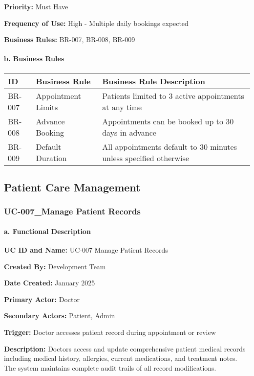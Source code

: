 \documentclass[12pt,a4paper]{article}
\begin{document}
\textbf{Priority:} Must Have

\textbf{Frequency of Use:} High - Multiple daily bookings expected

\textbf{Business Rules:} BR-007, BR-008, BR-009

\paragraph{b. Business Rules}

\begin{longtable}{|p{2cm}|p{4cm}|p{8cm}|}
\hline
\textbf{ID} & \textbf{Business Rule} & \textbf{Business Rule Description} \\
\hline
BR-007 & Appointment Limits & Patients limited to 3 active appointments at any time \\
\hline
BR-008 & Advance Booking & Appointments can be booked up to 30 days in advance \\
\hline
BR-009 & Default Duration & All appointments default to 30 minutes unless specified otherwise \\
\hline
\end{longtable}

\subsection{Patient Care Management}

\subsubsection{UC-007\_Manage Patient Records}

\paragraph{a. Functional Description}

\textbf{UC ID and Name:} UC-007 Manage Patient Records

\textbf{Created By:} Development Team

\textbf{Date Created:} January 2025

\textbf{Primary Actor:} Doctor

\textbf{Secondary Actors:} Patient, Admin

\textbf{Trigger:} Doctor accesses patient record during appointment or review

\textbf{Description:} Doctors access and update comprehensive patient medical records including medical history, allergies, current medications, and treatment notes. The system maintains complete audit trails of all record modifications.
\end{document}
